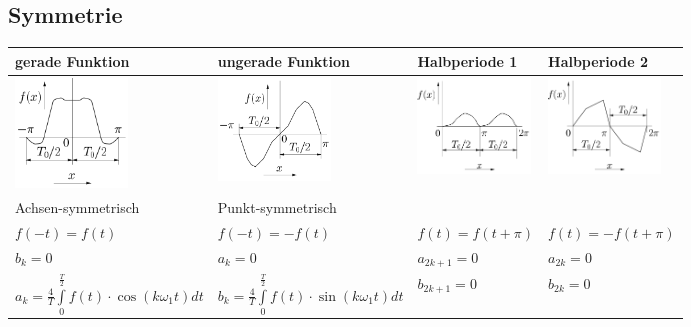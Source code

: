 	\subsection{Symmetrie}
		\begin{tabular}{|p{4.3cm}|p{4.3cm}||p{4.4cm}|p{4.4cm}|}
         	\hline
	        	\textbf{gerade Funktion} & \textbf{ungerade Funktion} &
	        	\textbf{Halbperiode 1} & \textbf{Halbperiode 2}\\
        	\hline
	        	\includegraphics[width=3cm,trim=0 0 0 -5]{./bilder/fourierReihe/gerade_funktion.png}&
	        	\includegraphics[width=3cm]{./bilder/fourierReihe/ungerade_funktion.png}&
	 			\includegraphics[width=3cm]{./bilder/fourierReihe/halbperiode_1.png}&   
				\includegraphics[width=3cm]{./bilder/fourierReihe/halbperiode_2.png}\\
			\hline
				Achsen-symmetrisch & Punkt-symmetrisch & & \\			
	   			$f(-t)=f(t)$ & $f(-t)=-f(t)$ & $f(t)=f(t+\pi)$ & $f(t)=-f(t+\pi)$\\
	   		\hline
	   			$b_k=0$ & $a_k=0$ & $a_{2k+1}=0$ & $a_{2k}=0$\\
	   			$a_k = \frac{4}{T} \int\limits_0^{\frac{T}{2}} f(t) \cdot \cos(k \omega_1
	   			t) dt$ &
	   			$b_k =  \frac{4}{T} \int\limits_0^{\frac{T}{2}} f(t) \cdot
				\sin(k \omega_1 t) dt$ &
				$b_{2k+1}=0$ & $b_{2k}=0$\\
			\hline
      	\end{tabular}

